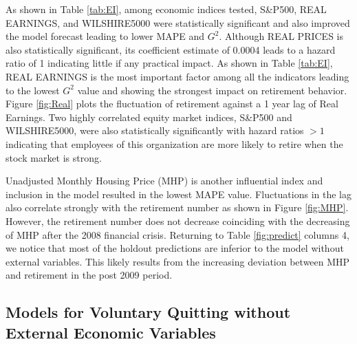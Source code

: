 \documentclass[12pt,letterpaper]{article}
\begin{document}
As shown in Table \ref{tab:EI}, among economic indices tested, S\&P500, REAL EARNINGS, and WILSHIRE5000 were statistically significant and also improved the model forecast leading to lower MAPE and $G^2$.  Although REAL PRICES is also statistically significant, its coefficient estimate of 0.0004 leads to a hazard ratio of 1 indicating little if any practical impact. As shown in Table \ref{tab:EI}, REAL EARNINGS is the most important factor among all the indicators leading to the lowest $G^2$ value and showing the strongest impact on retirement behavior.  Figure \ref{fig:Real} plots the fluctuation of retirement against a 1 year lag of Real Earnings. Two highly correlated equity market indices, S\&P500 and WILSHIRE5000, were also statistically significantly with hazard ratios $>1$ indicating that employees of this organization are more likely to retire when the stock market is strong.

Unadjusted Monthly Housing Price (MHP) is another influential index and inclusion in the model resulted in the lowest MAPE value. Fluctuations in the lag also correlate strongly with the retirement number as shown in Figure \ref{fig:MHP}. However, the retirement number does not decrease coinciding with the decreasing of MHP after the 2008 financial crisis.  Returning to Table \ref{fig:predict} columns 4, we notice that most of the holdout predictions are inferior to the model without external variables.  This likely results from the increasing deviation between MHP and retirement in the post 2009 period.


\subsection{Models for Voluntary Quitting without External Economic Variables}

\end{document}
